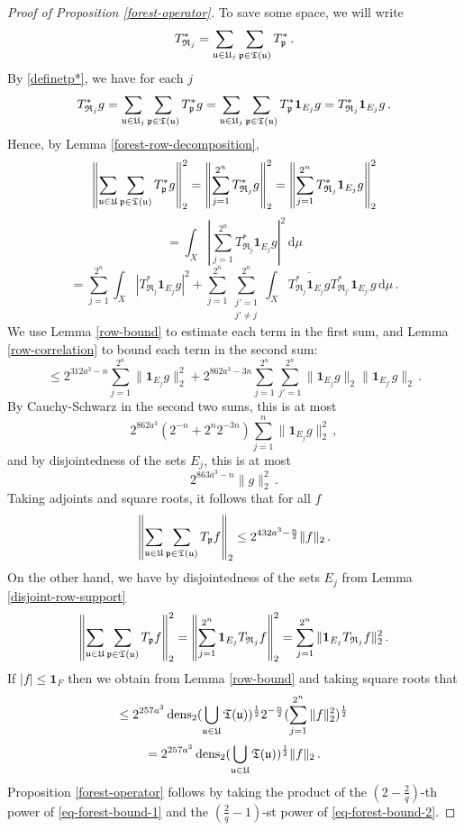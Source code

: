 {\begin{proof}[Proof of Proposition \ref{forest-operator}]
    To save some space, we will write
    $$
        T_{\mathfrak{R}_j}^* = \sum_{{\mathfrak u} \in {\mathfrak U}_j} \sum_{{\mathfrak p} \in {\mathfrak T}({\mathfrak u})} T_{{\mathfrak p}}^*\,.
    $$
    By \eqref{definetp*}, we have for each $j$
    $$
        T_{\mathfrak{R}_j}^*g = \sum_{{\mathfrak u} \in {\mathfrak U}_j} \sum_{{\mathfrak p} \in {\mathfrak T}({\mathfrak u})} T_{{\mathfrak p}}^* g = \sum_{{\mathfrak u} \in {\mathfrak U}_j} \sum_{{\mathfrak p} \in {\mathfrak T}({\mathfrak u})} T_{{\mathfrak p}}^* \mathbf{1}_{E_j} g = T_{\mathfrak{R}_j}^* \mathbf{1}_{E_j} g\,.
    $$
    Hence, by Lemma \ref{forest-row-decomposition},
    $$
        \left\|\sum_{{\mathfrak u} \in {\mathfrak U}} \sum_{{\mathfrak p} \in {\mathfrak T}({\mathfrak u})} T^*_{{\mathfrak p}} g\right\|_2^2 = \left\|\sum_{j = 1}^{2^n} T^*_{\mathfrak{R}_{j}} g\right\|_2^2  =  \left\|\sum_{j=1}^{2^n} T^*_{\mathfrak{R}_{j}} \mathbf{1}_{E_j} g\right\|_2^2
    $$
    $$
        = \int_X \left|\sum_{j=1}^{2^n} T^*_{\mathfrak{R}_{j}} \mathbf{1}_{E_j} g\right|^2 \, \mathrm{d}\mu
    $$
    $$
        = \sum_{j=1}^{2^n} \int_X |T_{\mathfrak{R}_j}^* \mathbf{1}_{E_j} g|^2 + \sum_{j =1}^{2^n} \sum_{\substack{j' = 1\\j' \ne j}}^{2^n} \int_X \overline{ T_{\mathfrak{R}_j}^* \mathbf{1}_{E_j} g} T_{\mathfrak{R}_{j'}}^* \mathbf{1}_{E_{j'}} g \, \mathrm{d}\mu\,.
    $$
    We use Lemma \ref{row-bound} to estimate each term in the first sum, and Lemma \ref{row-correlation} to bound each term in the second sum:
    $$
        \le 2^{312a^3-n} \sum_{j = 1}^{2^n} \|\mathbf{1}_{E_j} g\|_2^2 +  2^{862a^3-3 n}\sum_{j=1}^{2^n}\sum_{j' = 1}^{2^n} \|\mathbf{1}_{E_j} g\|_2 \|\mathbf{1}_{E_{j'}}g\|_2\,.
    $$
    By Cauchy-Schwarz in the second two sums, this is at most
    $$
        2^{862a^3} (2^{-n} + 2^{n}2^{-3 n}) \sum_{j = 1}^n \|\mathbf{1}_{E_j} g\|_2^2\,,
    $$
    and by disjointedness of the sets $E_j$, this is at most
    $$
        2^{863a^3 - n} \|g\|_2^2\,.
    $$
    Taking adjoints and square roots, it follows that for all $f$
    \begin{equation}
        \label{eq-forest-bound-1}
        \left\|\sum_{{\mathfrak u} \in {\mathfrak U}} \sum_{{\mathfrak p} \in {\mathfrak T}({\mathfrak u})} T_{{\mathfrak p}} f\right\|_2 \le 2^{432a^3-\frac{n}{2}} \|f\|_2\,.
    \end{equation}
    On the other hand, we have by disjointedness of the sets $E_j$
    from Lemma \ref{disjoint-row-support}
    $$
        \left\|\sum_{{\mathfrak u} \in {\mathfrak U}} \sum_{{\mathfrak p} \in {\mathfrak T}({\mathfrak u})} T_{{\mathfrak p}} f\right\|_2^2 =  \left\|\sum_{j=1}^{2^n} \mathbf{1}_{E_j} T_{\mathfrak{R}_{j}} f\right\|_2^2 = \sum_{j = 1}^{2^n} \|\mathbf{1}_{E_j} T_{\mathfrak{R}_{j}} f\|_2^2\,.
    $$
    If $|f| \le \mathbf{1}_F$ then we obtain from Lemma \ref{row-bound} and taking square roots that
    $$
        \le 2^{257a^3} \operatorname{\operatorname{dens}}_2(\bigcup_{{\mathfrak u}\in {\mathfrak U}}{\mathfrak T}({\mathfrak u}))^{\frac{1}{2}} 2^{-\frac{n}{2}} (\sum_{j = 1}^{2^n} \|f\|_2^2)^{\frac{1}{2}}
    $$
    \begin{equation}
        \label{eq-forest-bound-2}
        = 2^{257a^3} \operatorname{\operatorname{dens}}_2(\bigcup_{{\mathfrak u}\in {\mathfrak U}}{\mathfrak T}({\mathfrak u}))^{\frac{1}{2}} \|f\|_2\,.
    \end{equation}
    Proposition \ref{forest-operator} follows by taking the product of the $(2 - \frac{2}{q})$-th power of \eqref{eq-forest-bound-1} and the $(\frac{2}{q} - 1)$-st power of \eqref{eq-forest-bound-2}.
\end{proof}

}
